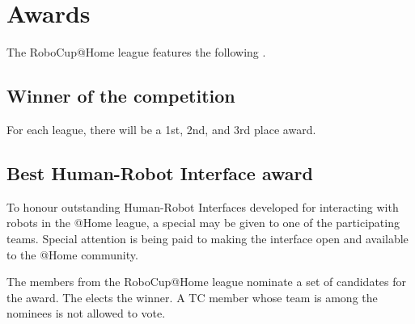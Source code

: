 \section{Awards}
\label{sec:awards}
The RoboCup@Home league features the following .

\subsection{Winner of the competition}
For each league, there will be a 1st, 2nd, and 3rd place award.

%
%
% 
% 


%
%
\subsection{Best Human-Robot Interface award}
\label{award:hri}
To honour outstanding Human-Robot Interfaces developed for interacting with robots in the @Home league, a special  may be given to one of the participating teams. Special attention is being paid to making the interface open and available to the @Home community.

The  members from the RoboCup@Home league nominate a set of candidates for the award. The  elects the winner. A TC member whose team is among the nominees is not allowed to vote.
 
